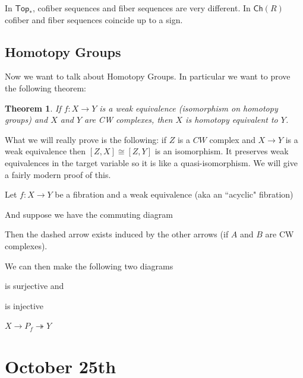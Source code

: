 \documentclass[10pt]{article}
\newtheorem{theorem}{Theorem}[section]
\theoremstyle{definition}
\begin{document}
In $\mathsf{Top}_*$, cofiber sequences and fiber sequences are very different. In $\mathsf{Ch}(R)$ cofiber and fiber sequences coincide up to a sign. 

\subsection{Homotopy Groups}
Now we want to talk about Homotopy Groups. In particular we want to prove the following theorem:
\begin{theorem}
	If $f:X\to Y$ is a weak equivalence (isomorphism on homotopy groups) and $X$ and $Y$ are CW complexes, then $X$ is homotopy equivalent to $Y$.
\end{theorem}
What we will really prove is the following: if $Z$ is a $CW$ complex and $X\to Y$ is a weak equivalence then $[Z,X]\cong [Z,Y]$ is an isomorphism. It preserves weak equivalences in the target variable so it is like a quasi-isomorphism. We will give a fairly modern proof of this. 

Let $f:X\to Y$ be a fibration and a weak equivalence (aka an ``acyclic" fibration)

And suppose we have the commuting diagram\begin{center}
\end{center}
Then the dashed arrow exists induced by the other arrows (if $A$ and $B$ are CW complexes).

We can then make the following two diagrams
\begin{center}
	 is surjective and 
	 is injective
\end{center}
$X\to P_f\twoheadrightarrow Y$ 
\section{October 25th}
\end{document}
